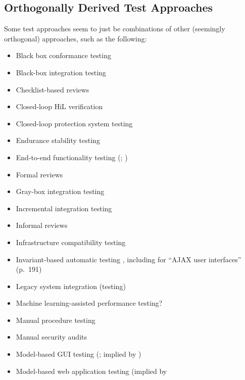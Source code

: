 \subsection{Orthogonally Derived Test Approaches}
\label{chap:testing:sec:orthogonal-tests}
Some test approaches seem to just be combinations of other (seemingly
orthogonal) approaches, such as the following:
\begin{itemize}
    \item Black box conformance testing \citep[p.~25]{JardEtAl1999}
    \item Black-box integration testing \citep[p.~345-346]{SakamotoEtAl2013}
    \item Checklist-based reviews \citepISTQB{}
    \item Closed-loop HiL verification \citep[p.~6]{PreußeEtAl2012}
    \item Closed-loop protection system testing \citep[p.~331]{ForsythEtAl2004}
    \item Endurance stability testing \citep[p.~55]{Firesmith2015}
    \item End-to-end functionality testing (\citealp[p.~20]{IEEE2021};
          \citealp[Tab.~2]{Gerrard2000a})
    \item Formal reviews \citepISTQB{}
    \item Gray-box integration testing \citep[p.~344]{SakamotoEtAl2013}
    \item Incremental integration testing \citep[p.~601]{SharmaEtAl2021}
    \item Informal reviews \citepISTQB{}
    \item Infrastructure compatibility testing \citep[p.~53]{Firesmith2015}
    \item Invariant-based automatic testing
          \citep[pp.~184-185,~Tab.~21]{DoğanEtAl2014}, including for
          ``AJAX user interfaces'' (p.~191)
    \item Legacy system integration (testing) \citep[Tab.~2]{Gerrard2000a}
    \item Machine learning-assisted performance testing? \citep{Moghadam2019}
    \item Manual procedure testing \citep[p.~47]{Firesmith2015}
    \item Manual security audits \citep[p.~28]{Gerrard2000b}
    \item Model-based GUI testing (\citealp[Tab.~1]{DoğanEtAl2014}; implied
          by \citealp[p.~356]{SakamotoEtAl2013})
    \item Model-based web application testing (implied by

\end{itemize}
